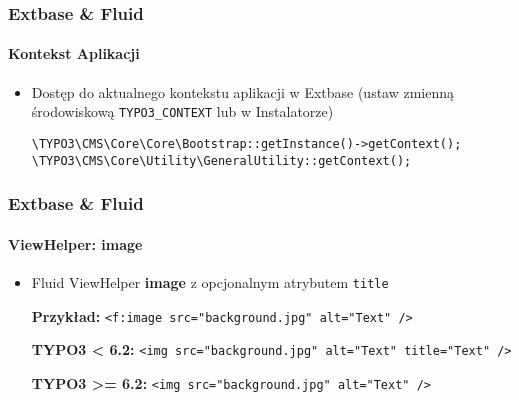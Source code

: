 
\begin{frame}[fragile]
	\frametitle{Extbase \& Fluid}
	\framesubtitle{Kontekst Aplikacji}

	\begin{itemize}
		\item Dostęp do aktualnego kontekstu aplikacji w Extbase\newline
			(ustaw zmienną środowiskową \texttt{TYPO3\_CONTEXT} lub w Instalatorze)\newline

			\lstinline!\TYPO3\CMS\Core\Core\Bootstrap::getInstance()->getContext();!
			\lstinline!\TYPO3\CMS\Core\Utility\GeneralUtility::getContext();!

	\end{itemize}

\end{frame}


\begin{frame}[fragile]
	\frametitle{Extbase \& Fluid}
	\framesubtitle{ViewHelper: image}

	\begin{itemize}
		\item Fluid ViewHelper \textbf{image} z opcjonalnym atrybutem \texttt{title} 

			\smaller\textbf{Przykład:}\normalsize\newline
			\lstinline!<f:image src="background.jpg" alt="Text" />!
			\newline

			\smaller\textbf{TYPO3 < 6.2:}\normalsize\newline
			\lstinline!<img src="background.jpg" alt="Text" title="Text" />!
			\newline

			\smaller\textbf{TYPO3 >= 6.2:}\normalsize\newline
			\lstinline!<img src="background.jpg" alt="Text" />!

	\end{itemize}

\end{frame}

